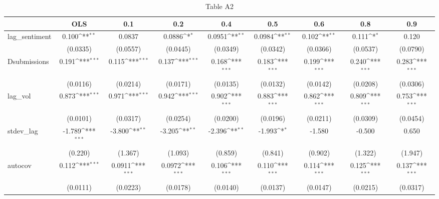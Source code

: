 \begin{table}[htbp]\centering
\def\sym#1{\ifmmode^{#1}\else\(^{#1}\)\fi}
\caption{Table A2}
\begin{tabular}{l*{8}{c}}
\toprule
                &\multicolumn{1}{c}{OLS}&\multicolumn{1}{c}{0.1}&\multicolumn{1}{c}{0.2}&\multicolumn{1}{c}{0.4}&\multicolumn{1}{c}{0.5}&\multicolumn{1}{c}{0.6}&\multicolumn{1}{c}{0.8}&\multicolumn{1}{c}{0.9}\\
\midrule
lag\_sentiment   &    0.100\sym{**} &   0.0837         &   0.0886\sym{*}  &   0.0951\sym{**} &   0.0984\sym{**} &    0.102\sym{**} &    0.111\sym{*}  &    0.120         \\
                & (0.0335)         & (0.0557)         & (0.0445)         & (0.0349)         & (0.0342)         & (0.0366)         & (0.0537)         & (0.0790)         \\
\addlinespace
Dsubmissions    &    0.191\sym{***}&    0.115\sym{***}&    0.137\sym{***}&    0.168\sym{***}&    0.183\sym{***}&    0.199\sym{***}&    0.240\sym{***}&    0.283\sym{***}\\
                & (0.0116)         & (0.0214)         & (0.0171)         & (0.0135)         & (0.0132)         & (0.0142)         & (0.0208)         & (0.0306)         \\
\addlinespace
lag\_vol         &    0.873\sym{***}&    0.971\sym{***}&    0.942\sym{***}&    0.902\sym{***}&    0.883\sym{***}&    0.862\sym{***}&    0.809\sym{***}&    0.753\sym{***}\\
                & (0.0101)         & (0.0317)         & (0.0254)         & (0.0200)         & (0.0196)         & (0.0211)         & (0.0309)         & (0.0454)         \\
\addlinespace
stdev\_lag       &   -1.789\sym{***}&   -3.800\sym{**} &   -3.205\sym{**} &   -2.396\sym{**} &   -1.993\sym{*}  &   -1.580         &   -0.500         &    0.650         \\
                &  (0.220)         &  (1.367)         &  (1.093)         &  (0.859)         &  (0.841)         &  (0.902)         &  (1.322)         &  (1.947)         \\
\addlinespace
autocov         &    0.112\sym{***}&   0.0911\sym{***}&   0.0972\sym{***}&    0.106\sym{***}&    0.110\sym{***}&    0.114\sym{***}&    0.125\sym{***}&    0.137\sym{***}\\
                & (0.0111)         & (0.0223)         & (0.0178)         & (0.0140)         & (0.0137)         & (0.0147)         & (0.0215)         & (0.0317)         \\

\end{tabular}
\end{table}
